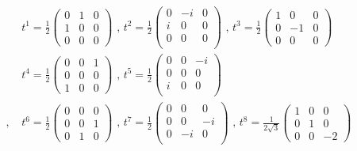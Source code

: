 \tiny
\begin{equation}\label{eq:gell_man_matrices}
\begin{aligned}
& t^{1} = \frac{1}{2}
  \begin{pmatrix}
    0 & 1 & 0 \\
    1 & 0 & 0 \\
    0 & 0 & 0 
  \end{pmatrix}
\text{   ,    }
t^{2} = \frac{1}{2}
  \begin{pmatrix}
    0 & -i & 0 \\
    i & 0 & 0 \\
    0 & 0 & 0 \\ 
  \end{pmatrix}
\text{   ,   }
t^{3} = \frac{1}{2}
  \begin{pmatrix}
    1 & 0 & 0 \\
    0 & -1 & 0 \\
    0 & 0 & 0
  \end{pmatrix} \\
& t^{4} = \frac{1}{2}
  \begin{pmatrix}
    0 & 0 & 1 \\
    0 & 0 & 0 \\
    1 & 0 & 0 
  \end{pmatrix}
\text{   ,    }
t^{5} = \frac{1}{2}
  \begin{pmatrix}
    0 & 0 & -i \\
    0 & 0 & 0 \\
    i & 0 & 0 \\ 
  \end{pmatrix} \\
\text{   ,   }
& t^{6} = \frac{1}{2}
  \begin{pmatrix}
    0 & 0 & 0 \\
    0 & 0 & 1 \\
    0 & 1 & 0 
  \end{pmatrix}
\text{   ,    }
t^{7} = \frac{1}{2}
  \begin{pmatrix}
    0 & 0 & 0 \\
    0 & 0 & -i \\
    0 & -i & 0 \\ 
  \end{pmatrix}
\text{   ,   }
t^{8} = \frac{1}{2\sqrt{3}}
  \begin{pmatrix}
    1 & 0 & 0 \\
    0 & 1 & 0 \\
    0 & 0 & -2
  \end{pmatrix}
\end{aligned}
\end{equation}
\normalsize

